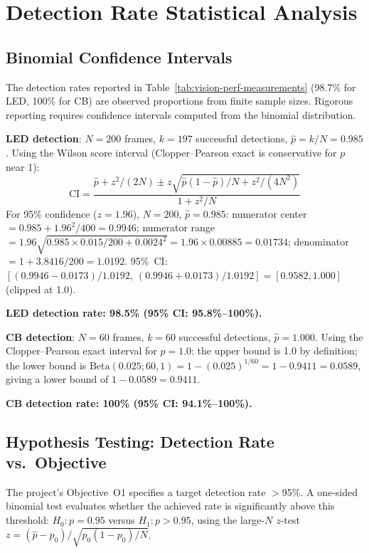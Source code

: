 \section{Detection Rate Statistical Analysis}

\subsection{Binomial Confidence Intervals}

The detection rates reported in Table~\ref{tab:vision-perf-measurements} (98.7\% for LED, 100\% for CB) are observed proportions from finite sample sizes. Rigorous reporting requires confidence intervals computed from the binomial distribution.

\begin{eqblock}
\textbf{LED detection}: $N=200$ frames, $k=197$ successful detections, $\hat p = k/N = 0.985$. Using the Wilson score interval (Clopper--Pearson exact is conservative for $p$ near 1):
\begin{equation}
\text{CI} = \frac{\hat p + z^2/(2N) \pm z\sqrt{\hat p(1-\hat p)/N + z^2/(4N^2)}}{1+z^2/N}
\end{equation}
For 95\% confidence ($z=1.96$), $N=200$, $\hat p=0.985$: numerator center $=0.985+1.96^2/400=0.9946$; numerator range $=1.96\sqrt{0.985\times0.015/200+0.0024^2}=1.96\times0.00885=0.01734$; denominator $=1+3.8416/200=1.0192$. 95\%~CI: $[(0.9946-0.0173)/1.0192,\ (0.9946+0.0173)/1.0192] = [0.9582, 1.000]$ (clipped at 1.0).

\textbf{LED detection rate: 98.5\% (95\% CI: 95.8\%--100\%).}
\end{eqblock}

\begin{eqblock}
\textbf{CB detection}: $N=60$ frames, $k=60$ successful detections, $\hat p=1.000$. Using the Clopper--Pearson exact interval for $p=1.0$: the upper bound is 1.0 by definition; the lower bound is $\text{Beta}(0.025; 60, 1) = 1-(0.025)^{1/60} = 1-0.9411 = 0.0589$, giving a lower bound of $1-0.0589=0.9411$.

\textbf{CB detection rate: 100\% (95\% CI: 94.1\%--100\%).}
\end{eqblock}

\subsection{Hypothesis Testing: Detection Rate vs.\ Objective}

The project's Objective~O1 specifies a target detection rate $>$95\%. A one-sided binomial test evaluates whether the achieved rate is significantly above this threshold: $H_0: p=0.95$ versus $H_1: p>0.95$, using the large-$N$ $z$-test $z = (\hat p - p_0)/\sqrt{p_0(1-p_0)/N}$.

